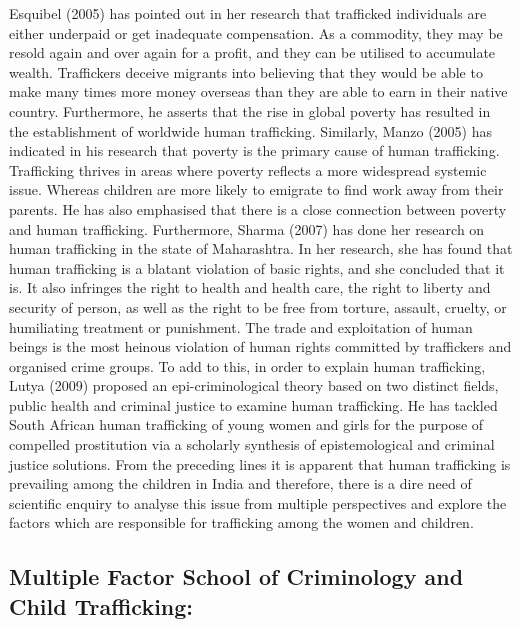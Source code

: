 \begin{multicols}{2}
\noi
Esquibel (2005) has pointed out in her research that trafficked individuals are either
underpaid or get inadequate compensation. As a commodity, they may be resold again
and over again for a profit, and they can be utilised to accumulate wealth. Traffickers
deceive migrants into believing that they would be able to make many times more
money overseas than they are able to earn in their native country. Furthermore, he
asserts that the rise in global poverty has resulted in the establishment of worldwide
human trafficking. Similarly, Manzo (2005) has indicated in his research that poverty
is the primary cause of human trafficking. Trafficking thrives in areas where poverty
reflects a more widespread systemic issue. Whereas children are more likely to emigrate
to find work away from their parents. He has also emphasised that there is a close
connection between poverty and human trafficking. Furthermore, Sharma (2007) has
done her research on human trafficking in the state of Maharashtra. In her research, she
has found that human trafficking is a blatant violation of basic rights, and she concluded
that it is. It also infringes the right to health and health care, the right to liberty and security of person, as well as the right to be free from torture, assault, cruelty, or
humiliating treatment or punishment. The trade and exploitation of human beings is the
most heinous violation of human rights committed by traffickers and organised crime
groups. To add to this, in order to explain human trafficking, Lutya (2009) proposed an
epi-criminological theory based on two distinct fields, public health and criminal justice
to examine human trafficking. He has tackled South African human trafficking of
young women and girls for the purpose of compelled prostitution via a scholarly
synthesis of epistemological and criminal justice solutions. From the preceding lines it
is apparent that human trafficking is prevailing among the children in India and
therefore, there is a dire need of scientific enquiry to analyse this issue from multiple
perspectives and explore the factors which are responsible for trafficking among the
women and children.

\subsection*{Multiple Factor School of Criminology and Child Trafficking:}


\end{multicols}
